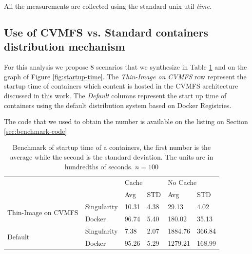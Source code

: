 All the measurements are collected using the standard unix util \textit{time}.

\subsection{Use of CVMFS vs. Standard containers distribution mechanism}

For this analysis we propose 8 scenarios that we synthesize in Table
\ref{tab:benchmark} and on the graph of Figure \ref{fig:startup-time}. The
\textit{Thin-Image on CVMFS} row represent the startup time of containers which
content is hosted in the CVMFS architecture discussed in this work. The
\textit{Default} columns represent the start up time of containers using the
default distribution system based on Docker Registries.

The code that we used to obtain the number is available on the listing on
Section \ref{sec:benchmark-code}

\begin{table}[]
\begin{tabular}{|l|l|l|l|l|l|}
\hline
\multicolumn{2}{|l|}{\multirow{2}{*}{}}            & \multicolumn{2}{l|}{Cache} & \multicolumn{2}{l|}{No Cache} \\ \cline{3-6} 
\multicolumn{2}{|l|}{}                             & Avg          & STD         & Avg            & STD          \\ \hline \hline
\multirow{2}{*}{Thin-Image on CVMFS} & Singularity & 10.31        & 4.38        & 29.13          & 4.02         \\ \cline{2-6} 
                                     & Docker      & 96.74        & 5.40        & 180.02         & 35.13        \\ \hline \hline
\multirow{2}{*}{Default}               & Singularity & 7.38         & 2.07        & 1884.76        & 366.84       \\ \cline{2-6} 
                                     & Docker      & 95.26        & 5.29        & 1279.21        & 168.99       \\ \hline
\end{tabular}
\caption{Benchmark of startup time of a containers, the first number is the average while the second is the standard deviation. The units are in hundredths of seconds. $n = 100$}
\label{tab:benchmark}
\end{table}

